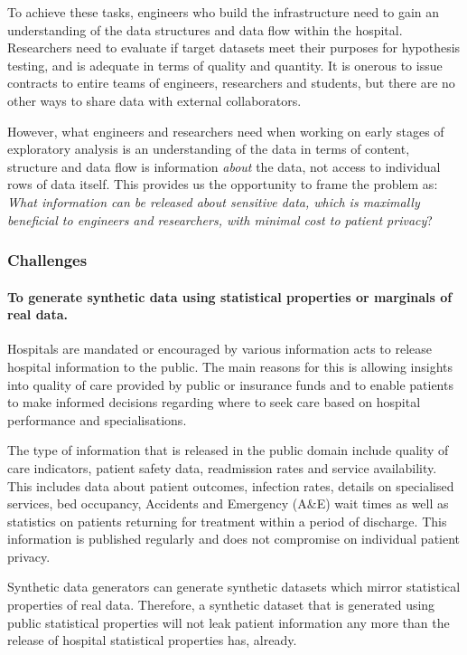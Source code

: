 \documentclass[11pt]{article}
\begin{document}
To achieve these tasks, engineers who build the infrastructure need to gain an understanding of the data structures and data flow within the hospital. Researchers need to evaluate if target datasets meet their purposes for hypothesis testing, and is adequate in terms of quality and quantity. It is onerous to issue contracts to entire teams of engineers, researchers and students, but there are no other ways to share data with external collaborators. 

However, what engineers and researchers need when working on early stages of exploratory analysis is an understanding of the data in terms of content, structure and data flow is information \emph{about} the data, not access to individual rows of data itself. This provides us the opportunity to frame the problem as: \emph{What information can be released about sensitive data, which is maximally beneficial to engineers and researchers, with minimal cost to patient privacy}?

\subsubsection{Challenges}

\paragraph{To generate synthetic data using statistical properties or marginals of real data.}
Hospitals are mandated or encouraged by various information acts to release hospital information to the public. The main reasons for this is allowing insights into quality of care provided by public or insurance funds and to enable patients to make informed decisions regarding where to seek care based on hospital performance and specialisations\cite{Werner2005}. 

The type of information that is released in the public domain include quality of care indicators, patient safety data, readmission rates and service availability. This includes data about patient outcomes, infection rates, details on specialised services, bed occupancy, Accidents and Emergency (A\&E) wait times as well as statistics on patients returning for treatment within a period of discharge. This information is published regularly and does not compromise on individual patient privacy.  

Synthetic data generators can generate synthetic datasets which mirror statistical properties of real data. Therefore, a synthetic dataset that is generated using public statistical properties will not leak patient information any more than the release of hospital statistical properties has, already. 
\end{document}
